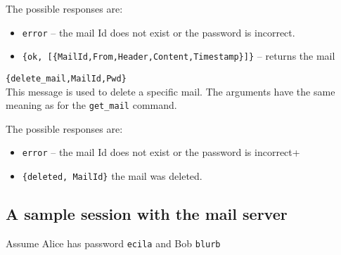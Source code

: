 \documentclass[12pt]{hitec}
\begin{document}
\begin{description}
  The possible responses are:
  
  \begin{itemize}
  
  \item \verb+error+ -- the mail Id does not exist or the password is incorrect.
  
\item \verb+{ok, [{MailId,From,Header,Content,Timestamp}]}+ -- returns the mail
  \end{itemize}

 
\item \verb+{delete_mail,MailId,Pwd}+\\
  This message is used to delete a specific mail. The arguments have the same
  meaning as for the \verb+get_mail+ command.

  The possible responses are:
  
  \begin{itemize}
  
  \item \verb+error+ -- the mail Id does not exist or the password is incorrect+
    
  \item \verb+{deleted, MailId}+ the mail was deleted.
    
  \end{itemize}

  

\end{description}

\subsection{A sample session with the mail server}

Assume Alice has password \verb+ecila+  and Bob \verb+blurb+
\end{document}
